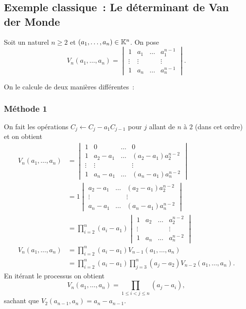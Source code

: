 \subsection{Exemple classique~: Le déterminant de Van der Monde}

Soit un naturel $n \geq 2$ et $(a_1, \ldots, a_n) \in \mathbb{K}^n$. On pose
\begin{equation}
  V_n(a_1, \ldots, a_n) =
  \begin{vmatrix}
    1 & a_1 & \ldots & a_1^{n-1} \\
    \vdots & \vdots &  & \vdots \\
    1 & a_n & \ldots & a_n^{n-1}
  \end{vmatrix}.
\end{equation}

On le calcule de deux manières différentes~:

\subsubsection{Méthode 1}

On fait les opérations $ C_j \leftarrow C_j - a_1C_{j-1}$ pour $j$ allant de $n$ à $2$ (dans cet ordre) et on obtient
\begin{align}
V_n(a_1, \ldots, a_n) &=
  \begin{vmatrix}
    1 & 0 & \ldots & 0 \\
    1 & a_2-a_1 & \ldots & (a_2-a_1)a_2^{n-2} \\
    \vdots & \vdots &  & \vdots \\
    1 & a_n-a_1 & \ldots & (a_n-a_1)a_n^{n-2}
  \end{vmatrix}\\
  &=1
  \begin{vmatrix}
    a_2-a_1 & \ldots & (a_2-a_1)a_2^{n-2} \\
    \vdots &  & \vdots \\
    a_n-a_1 & \ldots & (a_n-a_1)a_n^{n-2}
  \end{vmatrix}\\
  &=\prod_{i=2}^n(a_i-a_1)
  \begin{vmatrix}
    1 & a_2 &\ldots & a_2^{n-2} \\
    \vdots & & & \vdots \\
    1 & a_n &\ldots & a_n^{n-2}
  \end{vmatrix}\\
V_n(a_1, \ldots, a_n)  &=\prod_{i=2}^n(a_i-a_1) V_{n-1}(a_1, \ldots, a_n) \\
&=\prod_{i=2}^n(a_i-a_1) \prod_{j=3}^n(a_j-a_2) V_{n-2}(a_1, \ldots, a_n).
\end{align}
En itérant le processus on obtient
\begin{equation}
  V_n(a_1, \ldots, a_n) = \prod_{1 \le i < j \leq n} (a_j-a_i),
\end{equation}
sachant que $V_2(a_{n-1},a_n)=a_n-a_{n-1}$.

